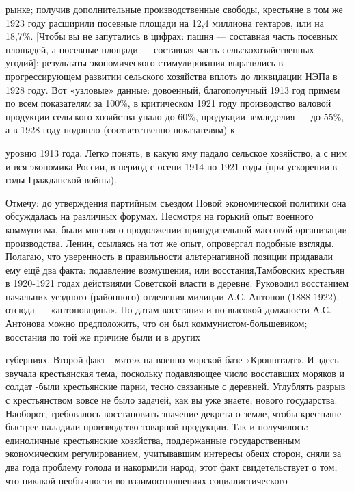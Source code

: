 \label{092-1}
рынке; получив дополнительные производственные свободы, крестьяне в том же 1923 году расширили посевные площади на 12,4 миллиона гектаров, или на 18,7\%. [Чтобы вы не запутались в цифрах: пашня — составная часть посевных площадей, а посевные площади — составная часть сельскохозяйственных угодий]; результаты экономического стимулирования выразились в прогрессирующем развитии сельского хозяйства вплоть до ликвидации НЭПа в 1928 году. Вот «узловые» данные: довоенный, благополучный 1913 год примем по всем показателям за 100\%, в критическом 1921 году производство валовой продукции сельского хозяйства упало до 60\%, продукции земледелия — до 55\%, а в 1928 году подошло (соответственно показателям) к

\label{093-1}
уровню 1913 года.
Легко понять, в какую яму падало сельское хозяйство, а с ним и вся экономика России, в период с осени 1914 по 1921 годы (при ускорении в годы Гражданской войны).

\label{094-1}
Отмечу: до утверждения партийным съездом Новой экономической политики она обсуждалась на различных форумах. Несмотря на горький опыт военного коммунизма, были мнения о продолжении принудительной массовой организации производства. Ленин, ссылаясь на тот же опыт, опровергал подобные взгляды. Полагаю, что уверенность в правильности альтернативной позиции придавали ему ещё два факта: подавление возмущения, или восстания,Тамбовских крестьян в 1920-1921 годах действиями Советской власти в деревне. Руководил восстанием начальник уездного (районного) отделения милиции А.С. Антонов (1888-1922), отсюда — «антоновщина». По датам восстания и по высокой должности А.С. Антонова можно предположить, что он был коммунистом-большевиком; восстания по той же причине были и в других

\label{095-1}
губерниях.
Второй факт - мятеж на военно-морской базе «Кронштадт». И здесь звучала крестьянская тема, поскольку подавляющее число восставших моряков и солдат -были крестьянские парни, тесно связанные с деревней. Углублять разрыв с крестьянством вовсе не было задачей, как вы уже знаете, нового государства. Наоборот, требовалось восстановить значение декрета о земле, чтобы крестьяне быстрее наладили производство товарной продукции. Так и получилось: единоличные крестьянские хозяйства, поддержанные государственным экономическим регулированием, учитывавшим интересы обеих сторон, сняли за два года проблему голода и накормили народ; этот факт свидетельствует о том, что никакой необычности во взаимоотношениях социалистического

